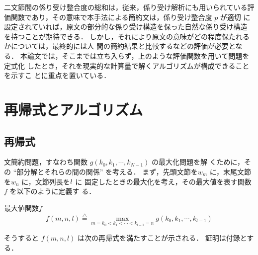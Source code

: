 二文節間の係り受け整合度の総和は，従来，係り受け解析にも用いられている評
価関数であり，その意味で本手法による簡約文は，係り受け整合度 $p$ が適切
に設定されていれば，原文の部分的な係り受け構造を保った自然な係り受け構造
を持つことが期待できる．
しかし，それにより原文の意味がどの程度保たれるかについては，最終的には人
間の簡約結果と比較するなどの評価が必要となる．
本論文では，そこまでは立ち入らず，上のような評価関数を用いて問題を定式化
したとき，それを現実的な計算量で解くアルゴリズムが構成できることを示すこ
とに重点を置いている．

\section{再帰式とアルゴリズム}
\subsection{再帰式}
 文簡約問題，すなわち関数 $g(k_0,k_1,{\cdots},k_{N-1})$ の最大化問題を解
くために，その ``部分解とそれらの間の関係'' を考える．
まず，先頭文節を$w_m$ に，末尾文節を$w_n$ に，文節列長を$l\/$ に
固定したときの最大化を考え，その最大値を表す関数$f$ を以下のように定義す
る．

\begin{definition}{最大値関数$f$} \hfill
\[
 \textstyle
 f(m,n,l) \stackrel{\triangle}{=}
  \max_{m=k_0<k_1<{\cdots}<k_{l-1}=n}g(k_0,k_1,{\cdots},k_{l-1})
\]
\end{definition}

\noindent
そうすると $f(m,n,l)$ は次の再帰式を満たすことが示される．
証明は付録とする．


